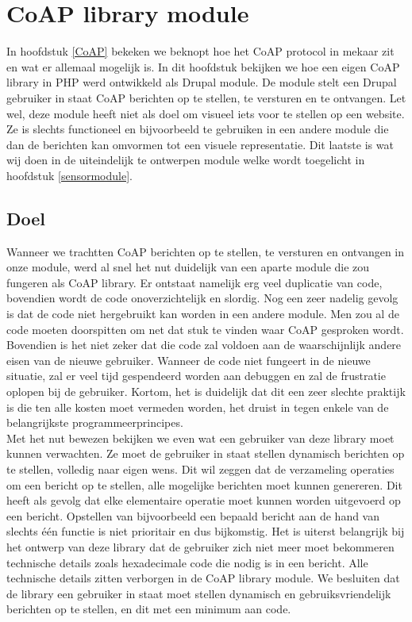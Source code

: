 \chapter{CoAP library module} \label{coaplibrary}

In hoofdstuk \ref{CoAP} bekeken we beknopt hoe het CoAP protocol in mekaar zit en wat er allemaal mogelijk is. In dit hoofdstuk bekijken we hoe een eigen CoAP library in PHP werd ontwikkeld als Drupal module. De module stelt een Drupal gebruiker in staat CoAP berichten op te stellen, te versturen en te ontvangen. Let wel, deze module heeft niet als doel om visueel iets voor te stellen op een website. Ze is slechts functioneel en bijvoorbeeld te gebruiken in een andere module die dan de berichten kan omvormen tot een visuele representatie. Dit laatste is wat wij doen in de uiteindelijk te ontwerpen module welke wordt toegelicht in hoofdstuk \ref{sensormodule}.

\section{Doel}

Wanneer we trachtten CoAP berichten op te stellen, te versturen en ontvangen in onze module, werd al snel het nut duidelijk van een aparte module die zou fungeren als CoAP library. Er ontstaat namelijk erg veel duplicatie van code, bovendien wordt de code onoverzichtelijk en slordig. Nog een zeer nadelig gevolg is dat de code niet hergebruikt kan worden in een andere module. Men zou al de code moeten doorspitten om net dat stuk te vinden waar CoAP gesproken wordt. Bovendien is het niet zeker dat die code zal voldoen aan de waarschijnlijk andere eisen van de nieuwe gebruiker. Wanneer de code niet fungeert in de nieuwe situatie, zal er veel tijd gespendeerd worden aan debuggen en zal de frustratie oplopen bij de gebruiker. Kortom, het is duidelijk dat dit een zeer slechte praktijk is die ten alle kosten moet vermeden worden, het druist in tegen enkele van de belangrijkste programmeerprincipes.\\

Met het nut bewezen bekijken we even wat een gebruiker van deze library moet kunnen verwachten. Ze moet de gebruiker in staat stellen dynamisch berichten op te stellen, volledig naar eigen wens. Dit wil zeggen dat de verzameling operaties om een bericht op te stellen, alle mogelijke berichten moet kunnen genereren. Dit heeft als gevolg dat elke elementaire operatie moet kunnen worden uitgevoerd op een bericht. Opstellen van bijvoorbeeld een bepaald bericht aan de hand van slechts \'{e}\'{e}n functie is niet prioritair en dus bijkomstig. Het is uiterst belangrijk bij het ontwerp van deze library dat de gebruiker zich niet meer moet bekommeren technische details zoals hexadecimale code die nodig is in een bericht. Alle technische details zitten verborgen in de CoAP library module. We besluiten dat de library een gebruiker in staat moet stellen dynamisch en gebruiksvriendelijk berichten op te stellen, en dit met een minimum aan code.

